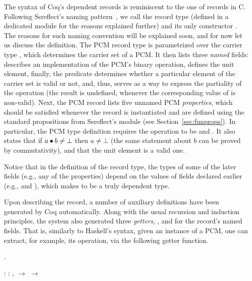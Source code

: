 The syntax of Coq's dependent records is reminiscent to the one of
records in C. Following Ssreflect's naming
pattern~\cite{Garillot-al:TPHOL09}, we call the record type (defined
in a dedicated module for the reasons explained further) 
and its only constructor . The reasons for such naming
convention will be explained soon, and for now let us discuss the
definition. The PCM record type is parametrized over the carrier type
, which determines the carrier set of a PCM. It then lists three
\textit{named} fields:  describes an implementation of the PCM's
binary operation,  defines the unit element, finally, the
 predicate determines whether a particular element of the
carrier set  is valid or not, and, thus, serves as a way to express
the partiality of the  operation (the result is undefined,
whenever the corresponding value of  is non-valid). Next, the PCM
record lists five unnamed PCM \textit{properties}, which should be satisfied
whenever the record is instantiated and are defined using the standard
propositions from Ssreflect's   module (see
Section~\ref{sec:funprops}). In particular, the PCM type definition
requires the operation to be  and . It also
states that if $a \bullet b \neq \bot$ then $a \neq \bot$ (the same
statement about $b$ can be proved by commutativity), and that the unit
element is a valid one.


Notice that in the definition of the  record type, the types
of some of the later fields (e.g., any of the properties) depend on
the values of fields declared earlier (e.g.,  and ),
which makes  to be a truly dependent type.


Upon describing the record, a number of auxiliary definitions have been
generated by Coq automatically. Along with the usual recursion and
induction principles, the system also generated three \textit{getters},
,  and   for the record's
named fields. That is, similarly to Haskell's syntax, given an
instance of a PCM, one can extract, for example, its operation, via
the following getter function.


\begin{coqdoccode}
\coqdocemptyline
\coqdocnoindent
{} .\coqdoceol
\coqdocemptyline
\end{coqdoccode}
\coqdoceol
\coqdocemptyline
\coqdocnoindent
{}\coqdoceol
\coqdocindent{2.50em}
: \coqdockw{\ensuremath{\forall}}  : ,   \ensuremath{\rightarrow}  \ensuremath{\rightarrow} 

